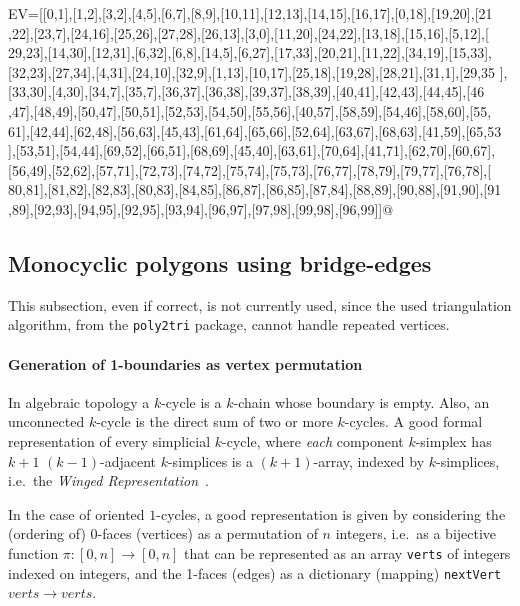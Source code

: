 \documentclass[11pt,oneside]{article}    %
\begin{document}
{EV=[[0,1],[1,2],[3,2],[4,5],[6,7],[8,9],[10,11],[12,13],[14,15],[16,17],[0,18],[19,20],[21
,22],[23,7],[24,16],[25,26],[27,28],[26,13],[3,0],[11,20],[24,22],[13,18],[15,16],[5,12],[
29,23],[14,30],[12,31],[6,32],[6,8],[14,5],[6,27],[17,33],[20,21],[11,22],[34,19],[15,33],
[32,23],[27,34],[4,31],[24,10],[32,9],[1,13],[10,17],[25,18],[19,28],[28,21],[31,1],[29,35
],[33,30],[4,30],[34,7],[35,7],[36,37],[36,38],[39,37],[38,39],[40,41],[42,43],[44,45],[46
,47],[48,49],[50,47],[50,51],[52,53],[54,50],[55,56],[40,57],[58,59],[54,46],[58,60],[55,
61],[42,44],[62,48],[56,63],[45,43],[61,64],[65,66],[52,64],[63,67],[68,63],[41,59],[65,53
],[53,51],[54,44],[69,52],[66,51],[68,69],[45,40],[63,61],[70,64],[41,71],[62,70],[60,67],
[56,49],[52,62],[57,71],[72,73],[74,72],[75,74],[75,73],[76,77],[78,79],[79,77],[76,78],[
80,81],[81,82],[82,83],[80,83],[84,85],[86,87],[86,85],[87,84],[88,89],[90,88],[91,90],[91
,89],[92,93],[94,95],[92,95],[93,94],[96,97],[97,98],[99,98],[96,99]]@}

\subsection{Monocyclic polygons using bridge-edges}

This subsection, even if correct, is not currently used, since the used triangulation algorithm, from the \texttt{poly2tri} package, cannot handle repeated vertices.

\paragraph{Generation of 1-boundaries as vertex permutation}
In algebraic topology a $k$-cycle is a $k$-chain whose boundary is empty. Also, an unconnected $k$-cycle is the direct sum of two or more $k$-cycles. A good formal representation of every simplicial $k$-cycle, where \emph{each} component $k$-simplex has $k+1$ $(k-1)$-adjacent $k$-simplices is a $(k+1)$-array, indexed by $k$-simplices, i.e.~the \emph{Winged Representation}~\cite{Paoluzzi:1993:DMS:169728.169719}. 

In the case of oriented $1$-cycles, a good representation is given by considering the (ordering of) 0-faces (vertices) as a permutation of $n$ integers, i.e.~as a bijective function $\pi :[0,n]\to[0,n]$ that can be represented as an array \texttt{verts} of integers indexed on integers, and the 1-faces (edges) as a dictionary (mapping) \texttt{nextVert} $verts\to verts$.
\end{document}
